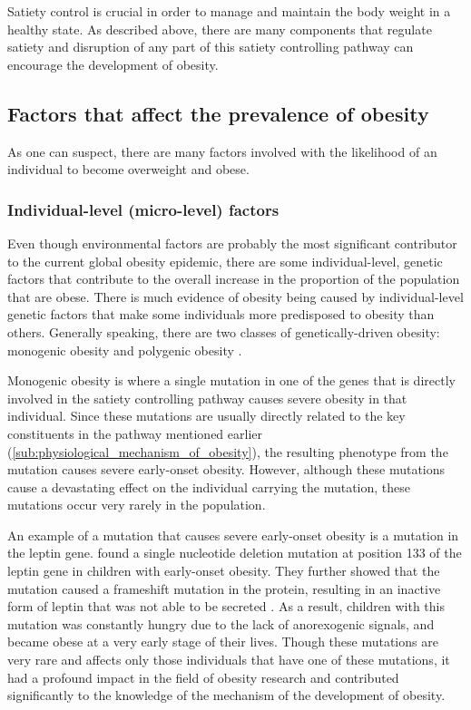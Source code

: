 Satiety control is crucial in order to manage  and maintain the body weight in a healthy state.
As described above, there are many components that regulate satiety and disruption of any part of this satiety controlling pathway can encourage the development of obesity.

\subsection{Factors that affect the prevalence of obesity}
\label{sub:factors_that_affect_the_prevalence_of_obesity}

As one can suspect, there are many factors involved with the likelihood of an individual to become overweight and obese.

\subsubsection{Individual-level (micro-level) factors}
\label{ssub:Individual-level_(micro-level)_factors}

Even though environmental factors are probably the most significant contributor to the current global obesity epidemic, there are some individual-level, genetic factors that contribute to the overall increase in the proportion of the population that are obese.
There is much evidence of obesity being caused by individual-level genetic factors that make some individuals more predisposed to obesity than others.
Generally speaking, there are two classes of genetically-driven obesity: monogenic obesity and polygenic obesity \citep{Moustafa2013}.

Monogenic obesity is where a single mutation in one of the genes that is directly involved in the satiety controlling pathway causes severe obesity in that individual.
Since these mutations are usually directly related to the key constituents in the pathway mentioned earlier (\cref{sub:physiological_mechanism_of_obesity}), the resulting phenotype from the mutation causes severe early-onset obesity.
However, although these mutations cause a devastating effect on the individual carrying the mutation, these mutations occur very rarely in the population.

An example of a mutation that causes severe early-onset obesity is a mutation in the leptin gene.
\citet{Montague1997} found a single nucleotide deletion mutation at position 133 of the leptin gene in children with early-onset obesity.
They further showed that the mutation caused a frameshift mutation in the protein, resulting in an inactive form of leptin that was not able to be secreted \citep{Montague1997}.
As a result, children with this mutation was constantly hungry due to the lack of anorexogenic signals, and became obese at a very early stage of their lives.
Though these mutations are very rare and affects only those individuals that have one of these mutations, it had a profound impact in the field of obesity research and contributed significantly to the knowledge of the mechanism of the development of obesity.

